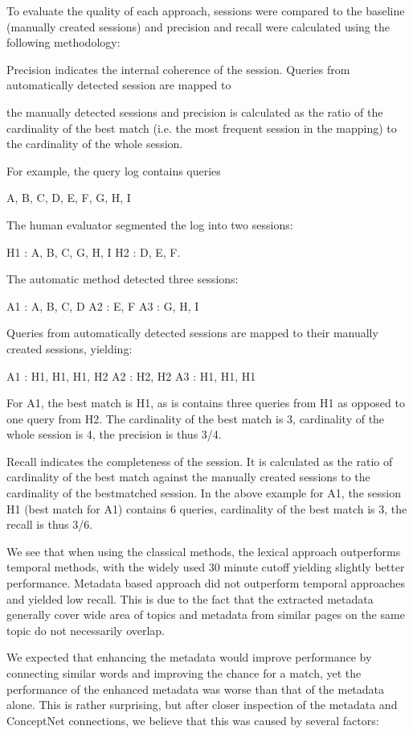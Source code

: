 \documentclass{acm_proc_article-sp} %
\begin{document}
To evaluate the quality of each approach, sessions were compared
to the baseline (manually created sessions) and precision
and recall were calculated using the following methodology:

Precision indicates the internal coherence of the session.
Queries from automatically detected session are mapped to

the manually detected sessions and precision is calculated as
the ratio of the cardinality of the best match (i.e. the most
frequent session in the mapping) to the cardinality of the
whole session.

For example, the query log contains queries

{A, B, C, D, E, F, G, H, I}

The human evaluator segmented the log into two sessions:

H1 : {A, B, C, G, H, I}
H2 : {D, E, F}.

The automatic method detected three sessions:

A1 : {A, B, C, D}
A2 : {E, F}
A3 : {G, H, I}

Queries from automatically detected sessions are mapped to
their manually created sessions, yielding:

A1 : {H1, H1, H1, H2}
A2 : {H2, H2}
A3 : {H1, H1, H1}

For A1, the best match is H1, as is contains three queries
from H1 as opposed to one query from H2. The cardinality
of the best match is 3, cardinality of the whole session is 4,
the precision is thus 3/4.

Recall indicates the completeness of the session. It is calculated
as the ratio of cardinality of the best match against
the manually created sessions to the cardinality of the bestmatched
session. In the above example for A1, the session
H1 (best match for A1) contains 6 queries, cardinality of the
best match is 3, the recall is thus 3/6.

We see that when using the classical methods, the lexical
approach outperforms temporal methods, with the widely
used 30 minute cutoff yielding slightly better performance.
Metadata based approach did not outperform temporal approaches
and yielded low recall. This is due to the fact that
the extracted metadata generally cover wide area of topics
and metadata from similar pages on the same topic do not
necessarily overlap.

We expected that enhancing the metadata would improve
performance by connecting similar words and improving the
chance for a match, yet the performance of the enhanced
metadata was worse than that of the metadata alone. This
is rather surprising, but after closer inspection of the metadata
and ConceptNet connections, we believe that this was
caused by several factors:
\end{document}
